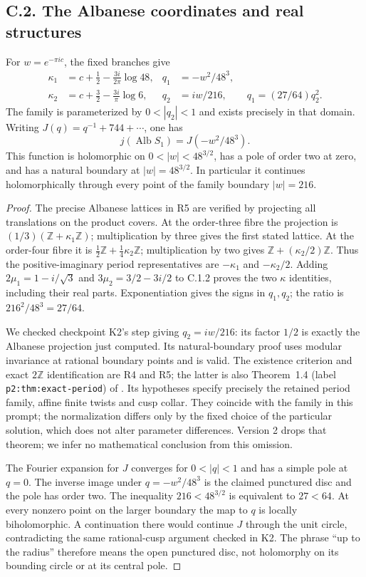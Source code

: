 \subsection{C.2. The Albanese coordinates and real structures}
\begin{proposition}\label{ari:C.2.1}
For $w=e^{-\pi ic}$, the fixed branches give
\begin{align*}
 \kappa_1&=c+\tfrac12-\frac{3i}{2\pi}\log48,&
 q_1&=-w^2/48^3,\\
 \kappa_2&=c+\tfrac32-\frac{3i}{\pi}\log6,&
 q_2&=iw/216,\qquad q_1=(27/64)q_2^2.
\end{align*}
The family is parameterized by $0<|q_2|<1$ and exists precisely in
that domain. Writing $J(q)=q^{-1}+744+\cdots$, one has
\[
 j(\operatorname{Alb}S_1)=J(-w^2/48^3).
\]
This function is holomorphic on $0<|w|<48^{3/2}$, has a pole of order
two at zero, and has a natural boundary at $|w|=48^{3/2}$.
In particular it continues holomorphically through every point of the
family boundary $|w|=216$.
\end{proposition}
\begin{proof}
The precise Albanese lattices in R5 are verified by projecting all
translations on the product covers. At the order-three fibre the
projection is $(1/3)(\mathbb Z+\kappa_1\mathbb Z)$; multiplication by
three gives the first stated lattice. At the order-four fibre it is
$\tfrac12\mathbb Z+\tfrac14\kappa_2\mathbb Z$; multiplication by two
gives $\mathbb Z+(\kappa_2/2)\mathbb Z$. Thus the positive-imaginary
period representatives are $-\kappa_1$ and $-\kappa_2/2$.
Adding $2\mu_1=1-i/\sqrt3$ and
$3\mu_2=3/2-3i/2$ to C.1.2 proves the two $\kappa$ identities,
including their real parts. Exponentiation gives the signs in $q_1,q_2$;
the ratio is $216^2/48^3=27/64$.

We checked checkpoint K2's step giving $q_2=iw/216$: its factor
$1/2$ is exactly the Albanese projection just computed. Its
natural-boundary proof uses modular invariance at rational boundary
points and is valid. The existence criterion and exact $2\mathbb Z$
identification are R4 and R5; the latter is also Theorem~1.4
(label \texttt{p2:thm:exact-period}) of
\cite{DuGuoKusakabeXie2026v1}. Its hypotheses specify precisely the
retained period family, affine finite twists and cusp collar. They
coincide with the family in this prompt; the normalization differs
only by the fixed choice of the particular solution, which does not
alter parameter differences. Version 2 drops that theorem; we infer
no mathematical conclusion from this omission.

The Fourier expansion for $J$ converges for $0<|q|<1$ and has a simple
pole at $q=0$. The inverse image under $q=-w^2/48^3$ is the claimed
punctured disc and the pole has order two. The inequality
$216<48^{3/2}$ is equivalent to $27<64$. At every nonzero point on the
larger boundary the map to $q$ is locally biholomorphic. A continuation
there would continue $J$ through the unit circle, contradicting the
same rational-cusp argument checked in K2. The phrase ``up to the
radius'' therefore means the open punctured disc, not holomorphy on
its bounding circle or at its central pole.
\end{proof}

